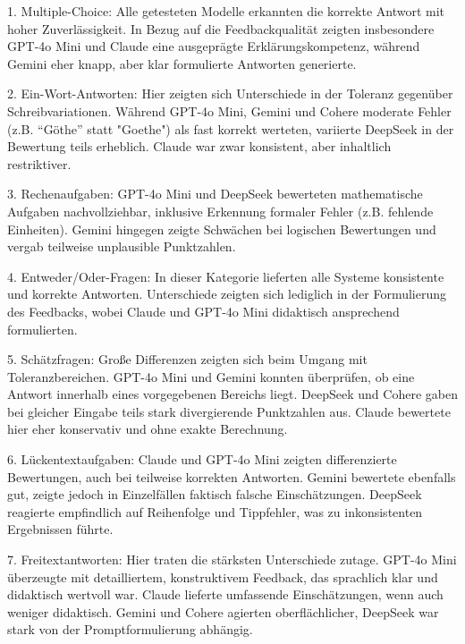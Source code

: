 \documentclass[a4paper,12pt]{article}
\begin{document}
1. Multiple-Choice:
Alle getesteten Modelle erkannten die korrekte Antwort mit hoher Zuverlässigkeit. In Bezug auf die Feedbackqualität zeigten insbesondere GPT-4o Mini und Claude eine ausgeprägte Erklärungskompetenz, während Gemini eher knapp, aber klar formulierte Antworten generierte.

2. Ein-Wort-Antworten:
Hier zeigten sich Unterschiede in der Toleranz gegenüber Schreibvariationen. Während GPT-4o Mini, Gemini und Cohere moderate Fehler (z.B. ``Göthe'' statt "Goethe") als fast korrekt werteten, variierte DeepSeek in der Bewertung teils erheblich. Claude war zwar konsistent, aber inhaltlich restriktiver.

3. Rechenaufgaben:
GPT-4o Mini und DeepSeek bewerteten mathematische Aufgaben nachvollziehbar, inklusive Erkennung formaler Fehler (z.B. fehlende Einheiten). Gemini hingegen zeigte Schwächen bei logischen Bewertungen und vergab teilweise unplausible Punktzahlen.

4. Entweder/Oder-Fragen:
In dieser Kategorie lieferten alle Systeme konsistente und korrekte Antworten. Unterschiede zeigten sich lediglich in der Formulierung des Feedbacks, wobei Claude und GPT-4o Mini didaktisch ansprechend formulierten.

5. Schätzfragen:
Große Differenzen zeigten sich beim Umgang mit Toleranzbereichen. GPT-4o Mini und Gemini konnten überprüfen, ob eine Antwort innerhalb eines vorgegebenen Bereichs liegt. DeepSeek und Cohere gaben bei gleicher Eingabe teils stark divergierende Punktzahlen aus. Claude bewertete hier eher konservativ und ohne exakte Berechnung.

6. Lückentextaufgaben:
Claude und GPT-4o Mini zeigten differenzierte Bewertungen, auch bei teilweise korrekten Antworten. Gemini bewertete ebenfalls gut, zeigte jedoch in Einzelfällen faktisch falsche Einschätzungen. DeepSeek reagierte empfindlich auf Reihenfolge und Tippfehler, was zu inkonsistenten Ergebnissen führte.

7. Freitextantworten:
Hier traten die stärksten Unterschiede zutage. GPT-4o Mini überzeugte mit detailliertem, konstruktivem Feedback, das sprachlich klar und didaktisch wertvoll war. Claude lieferte umfassende Einschätzungen, wenn auch weniger didaktisch. Gemini und Cohere agierten oberflächlicher, DeepSeek war stark von der Promptformulierung abhängig.
\end{document}
